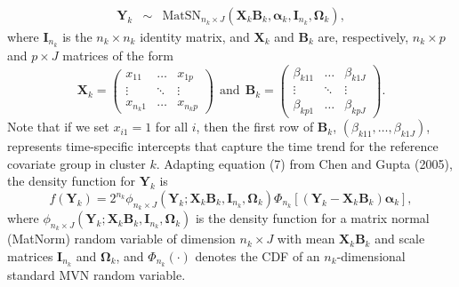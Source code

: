 \documentclass[useAMS,usenatbib,referee]{biom}
\begin{document}
\begin{eqnarray}
\mathbf{Y}_{k} &\sim& \text{MatSN}_{n_k \times J}(\mathbf{X}_k\mathbf{B}_k,\boldsymbol\alpha_k,\mathbf{I}_{n_k},\boldsymbol\Omega_k), \label{eq:matsn}
\end{eqnarray}
where $\mathbf{I}_{n_k}$ is the $n_k\times n_k$ identity matrix, and $\mathbf{X}_k$ and $\mathbf{B}_k$ are, respectively, $n_k\times p$ and $p\times J$ matrices of the form
\vspace{6pt}
\[
\mathbf{X}_k=\begin{pmatrix}x_{11} & \ldots & x_{1p}\\
              \vdots & \ddots & \vdots \\
              x_{n_k1} & \ldots & x_{n_kp} \end{pmatrix}
 ~~\text{and}~~
\mathbf{B}_k=\begin{pmatrix} \beta_{k11} & \ldots & \beta_{k1J}\\
              \vdots & \ddots & \vdots \\
              \beta_{kp1} & \ldots & \beta_{kpJ} \end{pmatrix}.
\]
\vspace{6pt}
Note that if we set $x_{i1}=1$ for all $i$, then the first row of $\mathbf{B}_k$, $(\beta_{k11},\dots,\beta_{k1J})$, represents time-specific intercepts that capture the time trend for the reference covariate group in cluster $k$. Adapting equation (7) from Chen and Gupta (2005), the density function for $\mathbf{Y}_k$ is
\begin{equation}
f(\mathbf{Y}_{k})=2^{n_k}\phi_{n_k\times J}(\mathbf{Y}_{k};\mathbf{X}_k\mathbf{B}_k,\mathbf{I}_{n_k},\boldsymbol\Omega_k)\Phi_{n_k}[(\mathbf{Y}_{k}-\mathbf{X}_k\mathbf{B}_k)\boldsymbol\alpha_k],
\end{equation}
where $\phi_{n_k\times J}(\mathbf{Y}_{k};\mathbf{X}_k\mathbf{B}_k,\mathbf{I}_{n_k},\boldsymbol\Omega_k)$ is the density function for a matrix normal (MatNorm) random variable of dimension $n_k\times J$ with mean $\mathbf{X}_k\mathbf{B}_k$ and scale matrices $\mathbf{I}_{n_k}$ and $\boldsymbol\Omega_k$, and $\Phi_{n_k}(\cdot)$ denotes the CDF of an $n_k$-dimensional standard MVN random variable.
\end{document}
